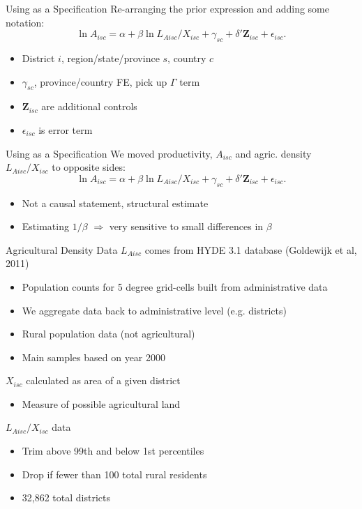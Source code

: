 \documentclass[10pt, xcolor=dvipsnames]{beamer}
\begin{document}
\begin{frame}{Using as a Specification}
Re-arranging the prior expression and adding some notation:
\begin{equation}
  \ln A_{isc} = \alpha + \beta \ln L_{Aisc}/X_{isc} + \gamma_{sc} + \delta' \mathbf{Z}_{isc} + \epsilon_{isc}. \label{EQ_regress}
\end{equation}

\begin{itemize}
  \item District $i$, region/state/province $s$, country $c$
  \item $\gamma_{sc}$, province/country FE, pick up $\Gamma$ term
  \item $\mathbf{Z}_{isc}$ are additional controls
  \item $\epsilon_{isc}$ is error term
\end{itemize}
\end{frame}

\begin{frame}{Using as a Specification}
We moved productivity, $A_{isc}$ and agric. density $L_{Aisc}/X_{isc}$ to opposite sides:
\begin{equation}
  \ln A_{isc} = \alpha + \beta \ln L_{Aisc}/X_{isc} + \gamma_{sc} + \delta' \mathbf{Z}_{isc} + \epsilon_{isc}. \label{EQ_regress}
\end{equation}

\begin{itemize}
  \item Not a causal statement, structural estimate
  \item Estimating $1/\beta$ $\Rightarrow$ very sensitive to small differences in $\beta$
\end{itemize}
\end{frame}

\begin{frame}{Agricultural Density Data}
$L_{Aisc}$ comes from HYDE 3.1 database (Goldewijk et al, 2011)
\begin{itemize}
  \item Population counts for 5 degree grid-cells built from administrative data
  \item We aggregate data back to administrative level (e.g. districts)
  \item Rural population data (not agricultural)
  \item Main samples based on year 2000
\end{itemize}
$X_{isc}$ calculated as area of a given district
\begin{itemize}
  \item Measure of possible agricultural land
\end{itemize}
$L_{Aisc}/X_{isc}$ data 
\begin{itemize}
  \item Trim above 99th and below 1st percentiles
  \item Drop if fewer than 100 total rural residents
  \item 32,862 total districts
\end{itemize}
\end{frame}
\end{document}
